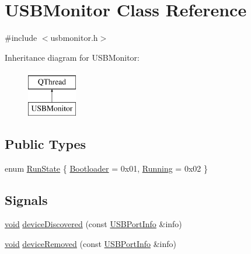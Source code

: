 \hypertarget{class_u_s_b_monitor}{\section{U\-S\-B\-Monitor Class Reference}
\label{class_u_s_b_monitor}
}


{\ttfamily \#include $<$usbmonitor.\-h$>$}

Inheritance diagram for U\-S\-B\-Monitor\-:\begin{figure}[H]
\begin{center}
\leavevmode
\includegraphics[height=2.000000cm]{class_u_s_b_monitor}
\end{center}
\end{figure}
\subsection*{Public Types}
\begin{DoxyCompactItemize}
\item 
enum \hyperlink{group___raw_h_i_d_plugin_gaff6bf8945a7cdab907cf5adc29bec064}{Run\-State} \{ \hyperlink{group___raw_h_i_d_plugin_ggaff6bf8945a7cdab907cf5adc29bec064ac18f9b621b18e8d33c36467a92dd0dc9}{Bootloader} = 0x01, 
\hyperlink{group___raw_h_i_d_plugin_ggaff6bf8945a7cdab907cf5adc29bec064a1a9efe940184d4bec69cb5d343eaaf81}{Running} = 0x02
 \}
\end{DoxyCompactItemize}
\subsection*{Signals}
\begin{DoxyCompactItemize}
\item 
\hyperlink{group___u_a_v_objects_plugin_ga444cf2ff3f0ecbe028adce838d373f5c}{void} \hyperlink{group___raw_h_i_d_plugin_gab2f32b160f38299dd97b8bce113ac016}{device\-Discovered} (const \hyperlink{struct_u_s_b_port_info}{U\-S\-B\-Port\-Info} \&info)
\item 
\hyperlink{group___u_a_v_objects_plugin_ga444cf2ff3f0ecbe028adce838d373f5c}{void} \hyperlink{group___raw_h_i_d_plugin_ga2184059e85771292590afbb9087ee225}{device\-Removed} (const \hyperlink{struct_u_s_b_port_info}{U\-S\-B\-Port\-Info} \&info)
\end{DoxyCompactItemize}
